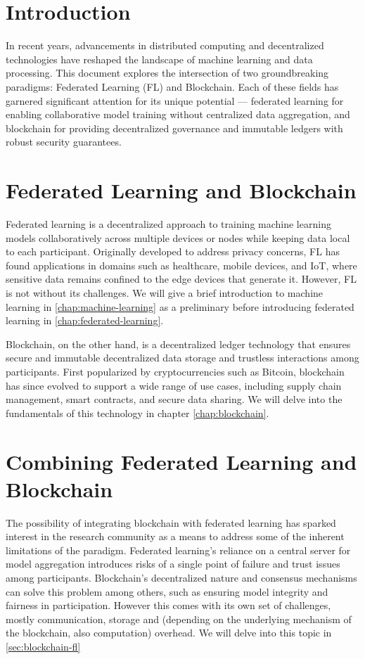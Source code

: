 \section*{Introduction}\label{chap:introduction}

In recent years, advancements in distributed computing and decentralized technologies have reshaped the
landscape of machine learning and data processing. This document explores the intersection of two
groundbreaking paradigms: Federated Learning (FL) and Blockchain. Each of these fields has garnered
significant attention for its unique potential — federated learning for enabling collaborative model training
without centralized data aggregation, and blockchain for providing decentralized governance and immutable ledgers
with robust security guarantees.

\section{Federated Learning and Blockchain}

Federated learning is a decentralized approach to training machine learning models collaboratively across
multiple devices or nodes while keeping data local to each participant. Originally developed to address
privacy concerns, FL has found applications in domains such as healthcare, mobile devices, and IoT, where
sensitive data remains confined to the edge devices that generate it. However, FL is not without its
challenges. We will give a brief introduction to machine learning in \ref{chap:machine-learning}
as a preliminary before introducing federated learning in \ref{chap:federated-learning}.

Blockchain, on the other hand, is a decentralized ledger technology that ensures secure and immutable
decentralized data storage and trustless interactions among participants.
First popularized by cryptocurrencies such as Bitcoin, blockchain has since evolved to support a wide range
of use cases, including supply chain management, smart
contracts, and secure data sharing. We will delve into the fundamentals of this technology in chapter \ref{chap:blockchain}.

\section{Combining Federated Learning and Blockchain}

The possibility of integrating blockchain with federated learning has sparked interest in the research community as a
means to address some of the inherent limitations of the paradigm.
Federated learning's reliance on a central server for model aggregation introduces risks of a single point of failure
and trust issues among participants.
Blockchain's decentralized nature and consensus mechanisms can solve this problem among others, such as
ensuring model integrity and fairness in participation. However this comes with its own set of challenges,
mostly communication, storage and (depending on the underlying mechanism of the blockchain, also computation) overhead.
We will delve into this topic in \ref{sec:blockchain-fl}

